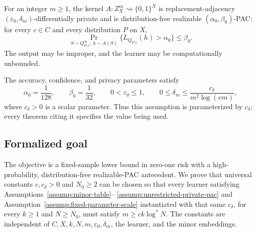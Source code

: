 \begin{assumption}
\label{assump:unrestricted-private-pac}
For an integer $m\geq1$, the kernel
$A:Z_X^m\rightsquigarrow\{0,1\}^X$ is replacement-adjacency
$(\varepsilon_0,\delta_m)$-differentially private and is distribution-free
realizable $(\alpha_0,\beta_0)$-PAC: for every $c\in C$ and every
distribution $P$ on $X$,
\[
\Pr_{S\sim Q_{P,c}^m,\ h\sim A(S)}
\bigl\{L_{Q_{P,c}}(h)>\alpha_0\bigr\}\leq\beta_0.
\]
The output may be improper, and the learner may be computationally
unbounded.
\end{assumption}

\begin{assumption}
\label{assump:fixed-parameter-scale}
The accuracy, confidence, and privacy parameters satisfy
\[
\alpha_0=\frac1{128},\qquad
\beta_0=\frac1{32},\qquad
0<\varepsilon_0\leq1,
\qquad
0\leq\delta_m\leq
\frac{c_\delta}{m^2\log(em)},
\]
where $c_\delta>0$ is a scalar parameter.  Thus this assumption is
parameterized by $c_\delta$; every theorem citing it specifies the value
being used.
\end{assumption}

\subsection{Formalized goal}

The objective is a fixed-sample lower bound in zero-one risk with a
high-probability, distribution-free realizable-PAC antecedent.  We prove that
universal constants $c,c_\delta>0$ and $N_0\geq2$ can be chosen so that every
learner satisfying Assumptions~\ref{assump:minor-table}--
\ref{assump:unrestricted-private-pac} and
Assumption~\ref{assump:fixed-parameter-scale} instantiated with that same
$c_\delta$, for every $k\geq1$ and $N\geq N_0$,
must satisfy $m\geq c k\log^*N$.  The constants are independent of
$C,X,k,N,m,\varepsilon_0,\delta_m$, the learner, and the minor embeddings.
